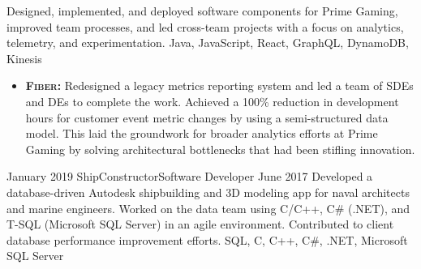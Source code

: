 \documentclass{cv}
\begin{document}
\begin{experiences_env}
{								Designed, implemented, and deployed software components for Prime Gaming, improved team processes, and led cross-team projects with a focus on analytics, telemetry, and experimentation.
							}
							{Java, JavaScript, React, GraphQL, DynamoDB, Kinesis}
							{
								\begin{itemize}
									\item \textbf{\textsc{Fiber:}} Redesigned a legacy metrics reporting system and led a team of SDEs and DEs to complete the work. Achieved a 100\% reduction in development hours for customer event metric changes by using a semi-structured data model. This laid the groundwork for broader analytics efforts at Prime Gaming by solving architectural bottlenecks that had been stifling innovation.
								\end{itemize}
							}
		\emptySeparator
		\experienceWithoutProjects
			{January 2019}  {ShipConstructor}{Software Developer}
			{June 2017}     {
								Developed a database-driven Autodesk shipbuilding and 3D modeling app for naval architects and marine engineers. Worked on the data team using C/C++, C\# (.NET), and T-SQL (Microsoft SQL Server) in an agile environment. Contributed to client database performance improvement efforts.
							}
							{SQL, C, C++, C\#, .NET, Microsoft SQL Server}
		\emptySeparator
	\end{experiences_env}
\end{document}
